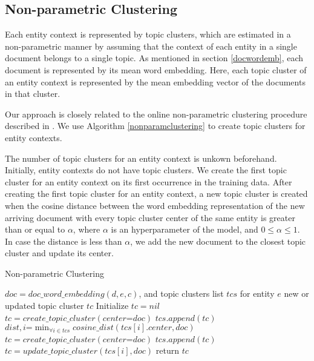 \documentclass{article}
\begin{document}
\subsection{Non-parametric Clustering}

Each entity context is represented by topic clusters, which are estimated in a non-parametric manner by assuming that the context of each entity in a single document belongs to a single topic. As mentioned in section \ref{docwordemb}, each document is represented by its mean word embedding. Here, each topic cluster of an entity context is represented by the mean embedding vector of the documents in that cluster.

Our approach is closely related to the online non-parametric clustering procedure described in \cite{Arvind14}.
We use Algorithm \ref{nonparamclustering} to create topic clusters for entity contexts.

The number of topic clusters for an entity context is unkown beforehand. Initially, entity contexts do not have topic clusters. We create the first topic cluster for an entity context on its first occurrence in the training data. After creating the first topic cluster for an entity context, a new topic cluster is created when the cosine distance between the word embedding representation of the new arriving document with every topic cluster center of the same entity is greater than or equal to $\alpha$, where $\alpha$ is an hyperparameter of the model, and $0 \leq \alpha \leq 1$. In case the distance is less than $\alpha$, we add the new document to the closest topic cluster and update its center.

\begin{algorithm}[tb]
   \caption{Non-parametric Clustering}
   \label{nonparamclustering}
\begin{algorithmic}
    $doc=doc\_word\_embedding(d, e, c)$, and topic clusters list $tcs$ for entity $e$
    new or updated topic cluster $tc$
   \STATE Initialize $tc = nil$
    \STATE $tc = create\_topic\_cluster(center\mathord{=}doc)$
    \STATE $tcs.append(tc)$
   \ELSE
     \STATE $dist, i \mathord{=} \min_{\forall{i \in tcs}}{cosine\_dist(tcs[i].center, doc)}$
        \STATE $tc = create\_topic\_cluster(center\mathord{=}doc)$
        \STATE $tcs.append(tc)$
     \ELSE
        \STATE $tc = update\_topic\_cluster(tcs[i], doc)$
     \ENDIF
   \ENDIF
   \STATE return $tc$
\end{algorithmic}
\end{algorithm}
\end{document}
